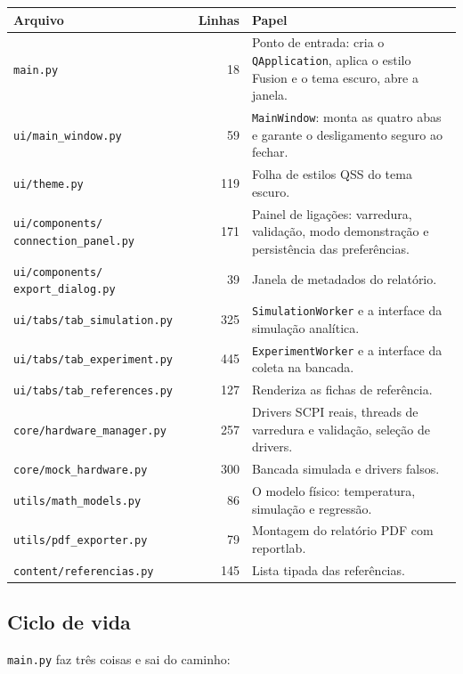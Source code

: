 \documentclass[11pt,a4paper]{article}
\newcommand{\arqv}[1]{\texttt{#1}}
\newcommand{\classe}[1]{\texttt{#1}}
\begin{document}
\begin{center}
\begin{longtable}{@{}p{5.6cm}r p{7.2cm}@{}}
\toprule
\textbf{Arquivo} & \textbf{Linhas} & \textbf{Papel} \\
\midrule
\endhead
\arqv{main.py} & 18 & Ponto de entrada: cria o \classe{QApplication}, aplica o estilo Fusion e o tema escuro, abre a janela. \\[0.3em]
\arqv{ui/main\_window.py} & 59 & \classe{MainWindow}: monta as quatro abas e garante o desligamento seguro ao fechar. \\[0.3em]
\arqv{ui/theme.py} & 119 & Folha de estilos QSS do tema escuro. \\[0.3em]
\arqv{ui/components/} \arqv{connection\_panel.py} & 171 & Painel de ligações: varredura, validação, modo demonstração e persistência das preferências. \\[0.3em]
\arqv{ui/components/} \arqv{export\_dialog.py} & 39 & Janela de metadados do relatório. \\[0.3em]
\arqv{ui/tabs/tab\_simulation.py} & 325 & \classe{SimulationWorker} e a interface da simulação analítica. \\[0.3em]
\arqv{ui/tabs/tab\_experiment.py} & 445 & \classe{ExperimentWorker} e a interface da coleta na bancada. \\[0.3em]
\arqv{ui/tabs/tab\_references.py} & 127 & Renderiza as fichas de referência. \\[0.3em]
\arqv{core/hardware\_manager.py} & 257 & Drivers SCPI reais, threads de varredura e validação, seleção de drivers. \\[0.3em]
\arqv{core/mock\_hardware.py} & 300 & Bancada simulada e drivers falsos. \\[0.3em]
\arqv{utils/math\_models.py} & 86 & O modelo físico: temperatura, simulação e regressão. \\[0.3em]
\arqv{utils/pdf\_exporter.py} & 79 & Montagem do relatório PDF com reportlab. \\[0.3em]
\arqv{content/referencias.py} & 145 & Lista tipada das referências. \\
\bottomrule
\end{longtable}
\end{center}

\subsection{Ciclo de vida}

\arqv{main.py} faz três coisas e sai do caminho:
\end{document}
